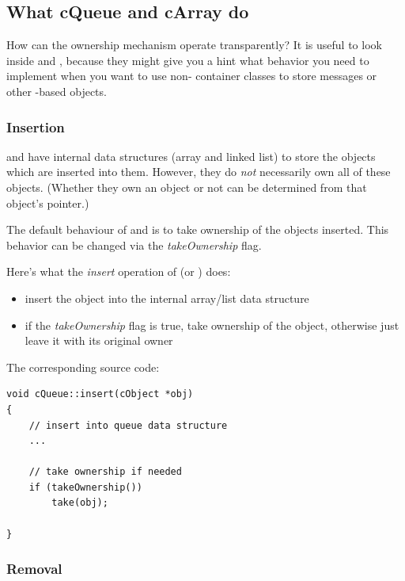 \subsection{What cQueue and cArray do}

How can the ownership mechanism operate transparently?
It is useful to look inside  and ,
because they might give you a hint what behavior you need
to implement when you want to use non-{\opp} container classes
to store messages or other -based objects.

\subsubsection{Insertion}

 and  have internal data structures
(array and linked list) to store the objects which are inserted
into them. However, they do \textit{not} necessarily own all of these
objects.  (Whether they own an object or not can be determined
from that object's  pointer.)

The default behaviour of  and  is
to take ownership of the objects inserted.
This behavior can be changed via the \textit{takeOwnership} flag.

Here's what the \textit{insert} operation of  (or ) does:
\begin{itemize}
    \item{insert the object into the internal array/list data structure}

    \item{if the \textit{takeOwnership} flag is true, take ownership
    of the object, otherwise just leave it with its original owner}
\end{itemize}

The corresponding source code:

\begin{verbatim}
void cQueue::insert(cObject *obj)
{
    // insert into queue data structure
    ...

    // take ownership if needed
    if (takeOwnership())
        take(obj);

}
\end{verbatim}


\subsubsection{Removal}

